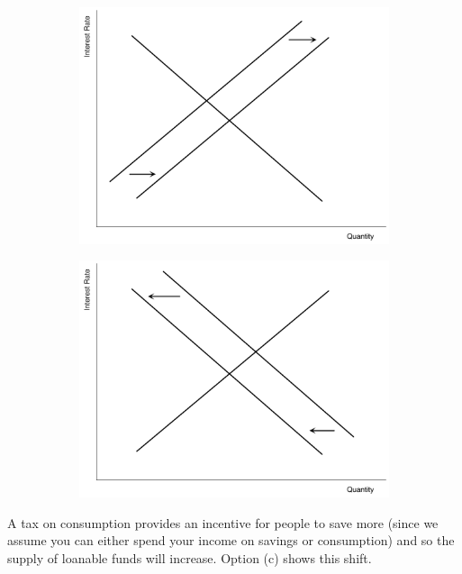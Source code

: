 \documentclass[addpoints,11pt]{exam}
\theoremstyle{definition}
\begin{document}
\begin{questions}
\begin{figure}[H]
	\begin{subfigure}[b]{0.5\textwidth}
		\centering
		\includegraphics[scale=.35]{loans3.pdf}
		\caption{}
	\end{subfigure}
	\begin{subfigure}[b]{0.5\textwidth}
		\centering
		\includegraphics[scale=.35]{loans4.pdf}
		\caption{}
	\end{subfigure}
\end{figure}

\begin{solution}
	A tax on consumption provides an incentive for people to save more (since we assume you can either spend your income on savings or consumption) and so the supply of loanable funds will increase. Option (c) shows this shift.
\end{solution}


\end{questions}
\end{document}
